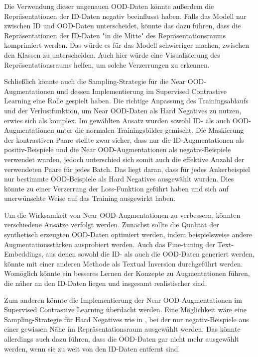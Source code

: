 Die Verwendung dieser ungenauen OOD-Daten könnte außerdem die Repräsentationen der ID-Daten negativ beeinflusst haben. Falls das Modell nur zwischen ID und OOD-Daten unterscheidet, könnte das dazu führen, dass die Repräsentationen der ID-Daten "in die Mitte" des Repräsentationsraums komprimiert werden. Das würde es für das Modell schwieriger machen, zwischen den Klassen zu unterscheiden. Auch hier würde eine Visualisierung des Repräsentationsraums helfen, um solche Verzerrungen zu erkennen.

Schließlich könnte auch die Sampling-Strategie für die Near OOD-Augmentationen und dessen Implementierung im Supervised Contrastive Learning eine Rolle gespielt haben. Die richtige Anpassung des Trainingsablaufs und der Verlustfunktion, um Near OOD-Daten als Hard Negatives zu nutzen, erwies sich als komplex. Im gewählten Ansatz wurden sowohl ID- als auch OOD-Augmentationen unter die normalen Trainingsbilder gemischt. Die Maskierung der kontrastiven Paare stellte zwar sicher, dass nur die ID-Augmentationen als positiv-Beispiele und die Near OOD-Augmentationen als negativ-Beispiele verwendet wurden, jedoch unterschied sich somit auch die effektive Anzahl der verwendeten Paare für jedes Batch. Das liegt daran, dass für jedes Ankerbeispiel nur bestimmte OOD-Beispiele als Hard Negatives ausgewählt wurden. Dies könnte zu einer Verzerrung der Loss-Funktion geführt haben und sich auf unerwünschte Weise auf das Training ausgewirkt haben.

Um die Wirksamkeit von Near OOD-Augmentationen zu verbessern, könnten verschiedene Ansätze verfolgt werden. Zunächst sollte die Qualität der synthetisch erzeugten OOD-Daten optimiert werden, indem beispielsweise andere Augmentationsstärken ausprobiert werden. Auch das Fine-tuning der Text-Embeddings, aus denen sowohl die ID- als auch die OOD-Daten generiert werden, könnte mit einer anderen Methode als Textual Inversion durchgeführt werden. Womöglich könnte ein besseres Lernen der Konzepte zu Augmentationen führen, die näher an den ID-Daten liegen und insgesamt realistischer sind.

Zum anderen könnte die Implementierung der Near OOD-Augmentationen im Supervised Contrastive Learning überdacht werden. Eine Möglichkeit wäre eine Sampling-Strategie für Hard Negatives wie in \parencite{Jiang2024supconhardnegatives}, bei der nur negativ-Beispiele aus einer gewissen Nähe im Repräsentationsraum ausgewählt werden. Das könnte allerdings auch dazu führen, dass die OOD-Daten gar nicht mehr ausgewählt werden, wenn sie zu weit von den ID-Daten entfernt sind.

